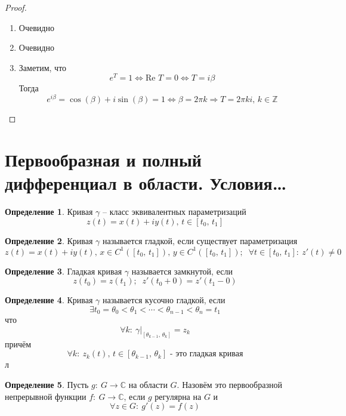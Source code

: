 \documentclass[a4paper,12pt]{article}
\theoremstyle{plain}
\theoremstyle{definition}
\newtheorem{definition}{Определение}[section]
\theoremstyle{remark}
\begin{document}
\begin{proof}
	\begin{enumerate}
		\item Очевидно
		\item Очевидно
		\item Заметим, что
		      \[
			      e^T = 1 \Leftrightarrow \text{Re }T = 0 \Leftrightarrow T = i\beta
		      \]
		      Тогда
		      \[
			      e^{i\beta} = \cos(\beta) + i\sin(\beta) = 1 \Leftrightarrow \beta = 2\pi k \Rightarrow T = 2\pi ki,\, k \in \mathbb{Z}
		      \]
	\end{enumerate}
\end{proof}

\section{Первообразная и полный дифференциал в области. Условия\dots}
\begin{definition}
	Кривая $\gamma$ -- класс эквивалентных параметризаций
	\[
		z(t) = x(t) + iy(t),\, t \in [t_0,\, t_1]
	\]
\end{definition}

\begin{definition}
	Кривая $\gamma$ называется гладкой, если существует параметризация
	\[
		z(t) = x(t) + iy(t),\, x \in C^1([t_0,\,t_1]),\, y \in C^1([t_0,\, t_1]);\;\; \forall t \in [t_0,\, t_1] :\: z'(t) \neq 0
	\]
\end{definition}

\begin{definition}
	Гладкая кривая $\gamma$ называется замкнутой, если
	\[
		z(t_0) = z(t_1);\;\; z'(t_0 + 0) = z'(t_1 - 0)
	\]
\end{definition}

\begin{definition}
	Кривая $\gamma$ называется кусочно гладкой, если
	\[
		\exists t_0 = \theta_0 < \theta_1 < \cdots < \theta_{n - 1} < \theta_n = t_1
	\]
	что 
	\[
		\forall k :\: \gamma|_{[\theta_{k - 1},\, \theta_k]} = z_k
	\]
	причём
	\[
		\forall k :\: z_k(t),\, t \in [\theta_{k-1},\, \theta_k] \text{ - это гладкая кривая}
	\]л
\end{definition}

\begin{definition}
	Пусть $g :\: G \to \mathbb{C}$ на области $G$. Назовём это первообразной непрерывной функции $f :\: G \to \mathbb{C}$, если $g$ регулярна на $G$ и
	\[
		\forall z \in G :\: g'(z) = f(z)
	\]
\end{definition}
\end{document}
